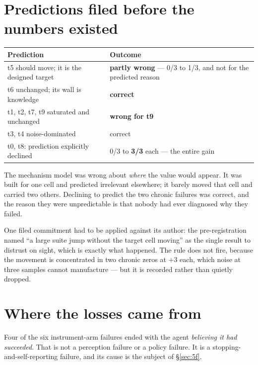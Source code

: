 \documentclass[11pt,a4paper]{report}
\begin{document}
\section{Predictions filed before the numbers existed}

\begin{table}[htbp]
\centering\small
\begin{tabularx}{\textwidth}{@{}X l@{}}
\toprule
\textbf{Prediction} & \textbf{Outcome} \\
\midrule
t5 should move; it is the designed target & \textbf{partly wrong} --- 0/3 to 1/3, and not for the predicted reason \\
t6 unchanged; its wall is knowledge & \textbf{correct} \\
t1, t2, t7, t9 saturated and unchanged & \textbf{wrong for t9} \\
t3, t4 noise-dominated & correct \\
t0, t8: prediction explicitly declined & 0/3 to \textbf{3/3} each --- the entire gain \\
\bottomrule
\end{tabularx}
\end{table}

\noindent
The mechanism model was wrong about \emph{where} the value would appear. It was
built for one cell and predicted irrelevant elsewhere; it barely moved that cell
and carried two others. Declining to predict the two chronic failures was
correct, and the reason they were unpredictable is that nobody had ever
diagnosed why they failed.

One filed commitment had to be applied against its author: the pre-registration
named ``a large suite jump without the target cell moving'' as the single result
to distrust on sight, which is exactly what happened. The rule does not fire,
because the movement is concentrated in two chronic zeros at $+3$ each, which
noise at three samples cannot manufacture --- but it is recorded rather than
quietly dropped.

\section{Where the losses came from}
\label{sec:losses}

Four of the six instrument-arm failures ended with the agent \emph{believing it
had succeeded}. That is not a perception failure or a policy failure. It is a
stopping-and-self-reporting failure, and its cause is the subject of §\ref{sec:5f}.
\end{document}

